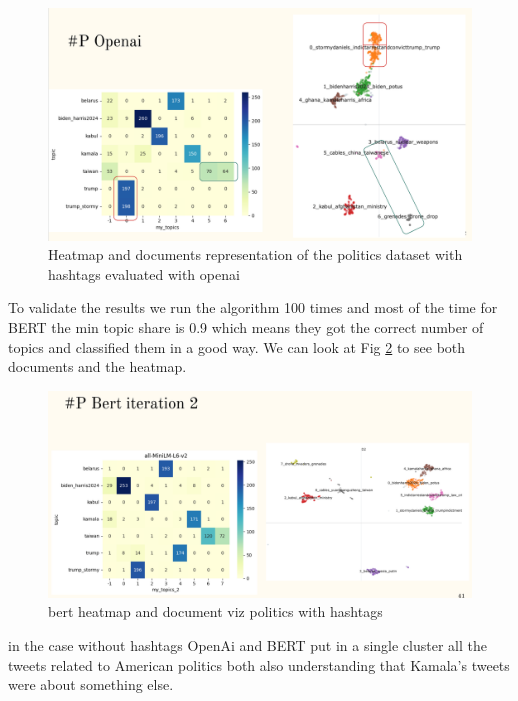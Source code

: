 \begin{figure}
    \centering
    \includegraphics[width=1\linewidth]{Chapter4/figures/openai_politics_hash_comparison.png}
    \caption{Heatmap and documents representation of the politics dataset with hashtags evaluated with openai}
    \label{fig:openai_heat_docs_politics_hash}
\end{figure}

To validate the results we run the algorithm 100 times and most of the time for BERT the min topic share is 0.9 which means they got the correct number of topics and classified them in a good way. We can look at Fig \ref{fig:bert politics with hashtags} to see both documents and the heatmap.

\begin{figure}
    \centering
    \includegraphics[width=1\linewidth]{Chapter4/figures/bert_politics_hash_comparison.png}
    \caption{bert heatmap and document viz politics with hashtags}
    \label{fig:bert politics with hashtags}
\end{figure}
in the case without hashtags OpenAi and BERT put in a single cluster all the tweets related to American politics both also understanding that Kamala's tweets were about something else.

